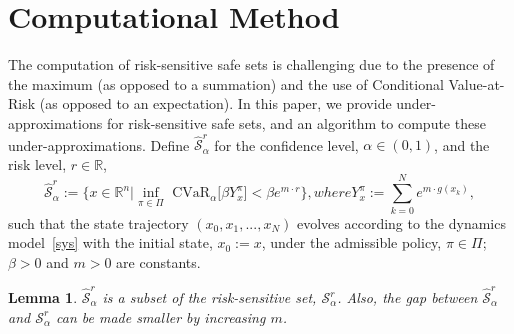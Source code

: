 \documentclass[letterpaper, 10 pt, conference]{ieeeconf}  %
\newtheorem{lemma}{Lemma}
\begin{document}
\section{Computational Method}\label{alg}
The computation of risk-sensitive safe sets is challenging due to the presence of the maximum (as opposed to a summation)
and the use of Conditional Value-at-Risk (as opposed to an expectation). In this paper, we provide under-approximations 
for risk-sensitive safe sets, and an algorithm to compute these under-approximations. Define $\hat{\mathcal{S}}_\alpha^r$
for the confidence level, $\alpha \in (0,1)$, and the risk level, $r \in \mathbb{R}$,
\begin{subequations}\label{under}\begin{equation}
\hat{\mathcal{S}}_\alpha^r := 
\Big\{x \in \mathbb{R}^n \Big| {\underset{\pi \in \Pi}\inf} \text{ CVaR}_\alpha \big[ \beta Y_x^\pi \big] < \beta e^{m\cdot r} \Big\},
\end{equation}
where
\begin{equation}
Y_x^\pi := \overset{N}{\underset{k=0}\sum} e^{m\cdot g(x_k)},
\end{equation}
\end{subequations}
such that the state trajectory $(x_0, x_1, ..., x_N)$
evolves according to the dynamics model~\eqref{sys} with the initial state, $x_0 := x$, under the admissible policy, $\pi \in \Pi$;
$\beta > 0$ and $m > 0$ are constants.
\begin{lemma}\label{lemma2}
$\hat{\mathcal{S}}_\alpha^r$ is a subset of the risk-sensitive set, $\mathcal{S}_\alpha^r$. 
Also, the gap between $\hat{\mathcal{S}}_\alpha^r$ and $\mathcal{S}_\alpha^r$ can be made smaller by increasing $m$.
\end{lemma}
\end{document}

